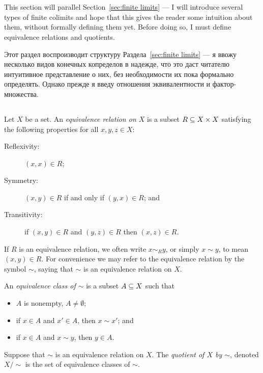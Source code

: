 \documentclass[CT4S-EN-RU]{subfiles}
\begin{document}
\section{}\label{sec:finite colimits}

\begin{blockENG}
This section will parallel Section~\ref{sec:finite limits} — I will introduce several types of finite colimits and hope that this gives the reader some intuition about them, without formally defining them yet. Before doing so, I must define equivalence relations and quotients.
\end{blockENG}

\begin{blockRUS}
Этот раздел воспроизводит структуру Раздела~\ref{sec:finite limits} — я ввожу несколько видов конечных копределов в надежде, что это даст читателю интуитивное представление о них, без необходимости их пока формально определять. Однако прежде я введу отношения эквивалентности и фактор-множества.
\end{blockRUS}


\subsection{}

\begin{definitionENG}
Let $X$ be a set. An {\em equivalence relation on $X$} is a subset $R\ss X\times X$ satisfying the following properties for all $x,y,z\in X$:
\begin{description}
\item[Reflexivity:] $(x,x)\in R$;
\item[Symmetry:] $(x,y)\in R$ if and only if $(y,x)\in R$; and
\item[Transitivity:] if $(x,y)\in R$ and $(y,z)\in R$ then $(x,z)\in R$.
\end{description}
If $R$ is an equivalence relation, we often write $x\sim_R y$, or simply $x\sim y$, to mean $(x,y)\in R$. For convenience we may refer to the equivalence relation by the symbol $\sim$, saying that $\sim$ is an equivalence relation on $X$.

An {\em equivalence class of $\sim$} is a subset $A\ss X$ such that
\begin{itemize}
\item $A$ is nonempty, $A\neq\emptyset$;
\item if $x\in A$ and $x'\in A$, then $x\sim x'$; and 
\item if $x\in A$ and $x\sim y$, then $y\in A$.
\end{itemize}
Suppose that $\sim$ is an equivalence relation on $X$. The {\em quotient of $X$ by $\sim$}, denoted $X/\sim$ is the set of equivalence classes of $\sim$.
\end{definitionENG}
\end{document}
